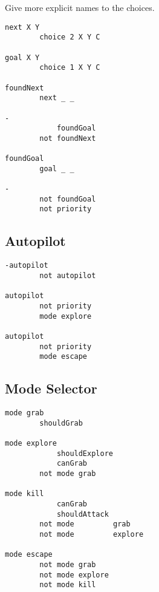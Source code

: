 Give more explicit names to the choices.

\begin{verbatim}
next X Y
        choice 2 X Y C

goal X Y
        choice 1 X Y C

foundNext
        next _ _

-
            foundGoal
        not foundNext

foundGoal
        goal _ _

-
        not foundGoal
        not priority
\end{verbatim}

\hypertarget{autopilot}{%
\subsection{Autopilot}\label{autopilot}}

\begin{verbatim}
-autopilot
        not autopilot

autopilot
        not priority
        mode explore

autopilot
        not priority
        mode escape
\end{verbatim}

\hypertarget{mode-selector}{%
\subsection{Mode Selector}\label{mode-selector}}

\begin{verbatim}
mode grab
        shouldGrab

mode explore
            shouldExplore
            canGrab
        not mode grab

mode kill
            canGrab
            shouldAttack
        not mode         grab
        not mode         explore

mode escape
        not mode grab
        not mode explore
        not mode kill
\end{verbatim}